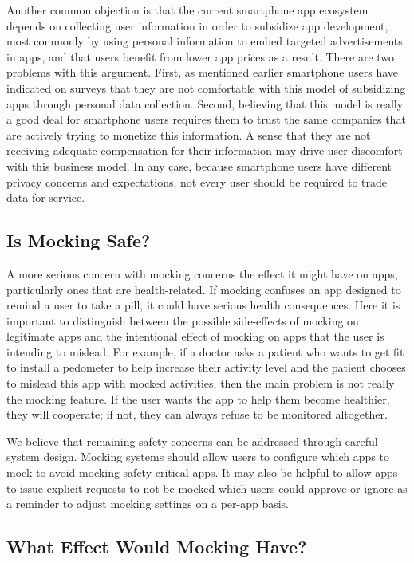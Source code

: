 Another common objection is that the current smartphone app ecosystem depends
on collecting user information in order to subsidize app development, most
commonly by using personal information to embed targeted advertisements in
apps, and that users benefit from lower app prices as a result. There are two
problems with this argument. First, as mentioned earlier smartphone users
have indicated on surveys that they are not comfortable with this model of
subsidizing apps through personal data collection. Second, believing that
this model is really a good deal for smartphone users requires them to trust
the same companies that are actively trying to monetize this information. A
sense that they are not receiving adequate compensation for their information
may drive user discomfort with this business model. In any case, because
smartphone users have different privacy concerns and expectations, not every
user should be required to trade data for service.

\subsection{Is Mocking Safe?}

A more serious concern with mocking concerns the effect it might have on
apps, particularly ones that are health-related. If mocking confuses an app
designed to remind a user to take a pill, it could have serious health
consequences. Here it is important to distinguish between the possible
side-effects of mocking on legitimate apps and the intentional effect of
mocking on apps that the user is intending to mislead. For example, if a
doctor asks a patient who wants to get fit to install a pedometer to help
increase their activity level and the patient chooses to mislead this app
with mocked activities, then the main problem is not really the mocking
feature. If the user wants the app to help them become healthier, they will
cooperate; if not, they can always refuse to be monitored altogether.

We believe that remaining safety concerns can be addressed through careful
system design. Mocking systems should allow users to configure which apps to
mock to avoid mocking safety-critical apps. It may also be helpful to allow
apps to issue explicit requests to not be mocked which users could approve or
ignore as a reminder to adjust mocking settings on a per-app basis.

\subsection{What Effect Would Mocking Have?}

